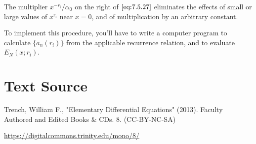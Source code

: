 \documentclass{ximera}
\begin{document}
The multiplier $x^{-r_i}/\alpha_0$ on the right of $\eqref{eq:7.5.27}$
eliminates the effects of small or large values of $x^{r_i}$ near
$x=0$, and of multiplication by an arbitrary constant. 


To implement this procedure, you'll have to write a computer program to
calculate $\{a_n(r_i)\}$ from the applicable recurrence relation, and
to evaluate $E_N(x;r_i)$.




\section*{Text Source}
Trench, William F., "Elementary Differential Equations" (2013). Faculty Authored and Edited Books \& CDs. 8. (CC-BY-NC-SA)

\href{https://digitalcommons.trinity.edu/mono/8/}{https://digitalcommons.trinity.edu/mono/8/}
\end{document}
